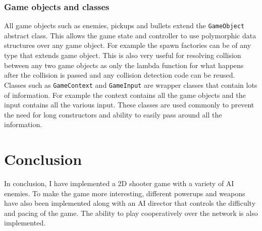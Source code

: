 \documentclass{article}
\newcommand{\n}[0]{\\[\baselineskip]}
\begin{document}
\subsubsection{Game objects and classes}
All game objects such as enemies, pickups and bullets extend the \texttt{GameObject} abstract class. This allows the game state and controller to use polymorphic data structures over any game object. For example the spawn factories can be of any type that extends game object. This is also very useful for resolving collision between any two game objects as only the lambda function for what happens after the collision is passed and any collision detection code can be reused. 
\n
Classes such as \texttt{GameContext} and \texttt{GameInput} are wrapper classes that contain lots of information. For example the context contains all the game objects and the input contains all the various input. These classes are used commonly to prevent the need for long constructors and ability to easily pass around all the information. 
\section{Conclusion}
In conclusion, I have implemented a 2D shooter game with a variety of AI enemies. To make the game more interesting, different powerups and weapons have also been implemented along with an AI director that controls the difficulty and pacing of the game. The ability to play cooperatively over the network is also implemented.

\printbibliography
\end{document}
